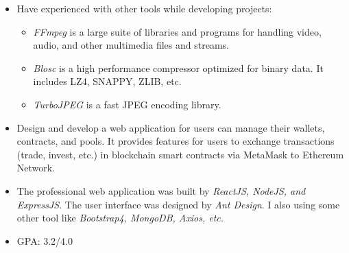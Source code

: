 \documentclass[10pt,a4paper,ragged2e,withhyper]{altacv}
\begin{document}
\begin{paracol}{2}
\begin{minipage}{\linewidth}
\begin{itemize}
	\item Have experienced with other tools while developing projects:
	\begin{itemize}
		\renewcommand\labelitemii{--}
		
		\item \textit{FFmpeg} is a large suite of libraries and programs for handling video, audio, and other multimedia files and streams.
		\item \textit{Blosc} is a high performance compressor optimized for binary data. It includes LZ4, SNAPPY, ZLIB, etc.
		\item \textit{TurboJPEG} is a fast JPEG encoding library.
	\end{itemize}
\end{itemize}
\end{minipage}

\smallskip

\divider

\medskip 

\begin{itemize}
	
\justifying
\item Design and develop a web application for users can manage their wallets, contracts, and pools. It provides features for users to exchange transactions (trade, invest, etc.) in blockchain smart contracts via MetaMask to Ethereum Network.
\item The professional web application was built by \textit{ReactJS, NodeJS, and ExpressJS}. The user interface was designed by \textit{Ant Design}. I also using some other tool like \textit{Bootstrap4, MongoDB, Axios, etc.}

\end{itemize}



\medskip


\switchcolumn

\begin{itemize}
	\item GPA: 3.2/4.0
\end{itemize}
\smallskip


\end{paracol}
\end{document}
